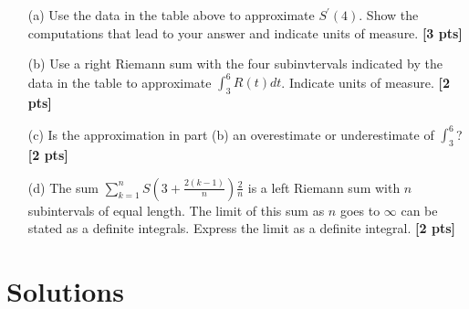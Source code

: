\documentclass{article}
\newcommand{\qspace}{\vspace*{1.7em}}
\begin{document}
    \begin{enumerate}
        
        \item[(a)] Use the data in the table above to approximate $S^{\prime}(4)$. Show the computations that lead to your answer
                   and indicate units of measure. \textbf{[3 pts]} \qspace 
        \item[(b)] Use a right Riemann sum with the four subinvtervals indicated by the data in the table to 
                   approximate $\int_3^6 R(t)dt$. Indicate units of measure. \textbf{[2 pts]} \qspace
        \item[(c)] Is the approximation in part (b) an overestimate or underestimate of $\int_3^6$? \textbf{[2 pts]} \qspace
        \item[(d)] The sum $\sum_{k = 1}^n S\left(3 + \frac{2(k - 1)}{n}\right)\frac{2}{n}$ is a left Riemann sum with $n$ subintervals of equal length. 
                   The limit of this sum as $n$ goes to $\infty$ can be stated as a definite integrals. Express the limit as a definite integral. \textbf{[2 pts]}

    \end{enumerate}
    \newpage



    \section*{Solutions}
\end{document}
